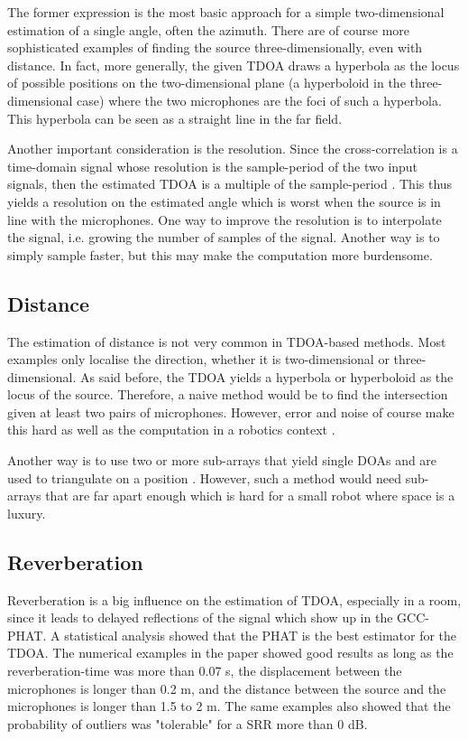 \documentclass[notitlepage]{report}
\begin{document}
The former expression is the most basic approach for a simple two-dimensional estimation of a single angle, often the azimuth. There are of course more sophisticated examples of finding the source three-dimensionally, even with distance. In fact, more generally, the given TDOA draws a hyperbola as the locus of possible positions on the two-dimensional plane (a hyperboloid in the three-dimensional case) where the two microphones are the foci of such a hyperbola. This hyperbola can be seen as a straight line in the far field.

Another important consideration is the resolution. Since the cross-correlation is a time-domain signal whose resolution is the sample-period of the two input signals, then the estimated TDOA is a multiple of the sample-period \cite{argentieri_survey_2015}. This thus yields a resolution on the estimated angle which is worst when the source is in line with the microphones. One way to improve the resolution is to interpolate the signal, i.e. growing the number of samples of the signal. Another way is to simply sample faster, but this may make the computation more burdensome.

\subsection{Distance}

The estimation of distance is not very common in TDOA-based methods. Most examples only localise the direction, whether it is two-dimensional or three-dimensional. As said before, the TDOA yields a hyperbola or hyperboloid as the locus of the source. Therefore, a naive method would be to find the intersection given at least two pairs of microphones. However, error and noise of course make this hard as well as the computation in a robotics context \cite{rascon_localization_2017}.

Another way is to use two or more sub-arrays that yield single DOAs and are used to triangulate on a position \cite{rascon_localization_2017}. However, such a method would need sub-arrays that are far apart enough which is hard for a small robot where space is a luxury.


\subsection{Reverberation}

Reverberation is a big influence on the estimation of TDOA, especially in a room, since it leads to delayed reflections of the signal which show up in the GCC-PHAT. A statistical analysis \cite{gustafsson_source_2003} showed that the PHAT is the best estimator for the TDOA. The numerical examples in the paper showed good results as long as the reverberation-time was more than 0.07 \si{s}, the displacement between the microphones is longer than 0.2 \si{m}, and the distance between the source and the microphones is longer than 1.5 to 2 \si{m}. The same examples also showed that the probability of outliers was "tolerable" for a SRR more than 0 \si{dB}.
\end{document}
